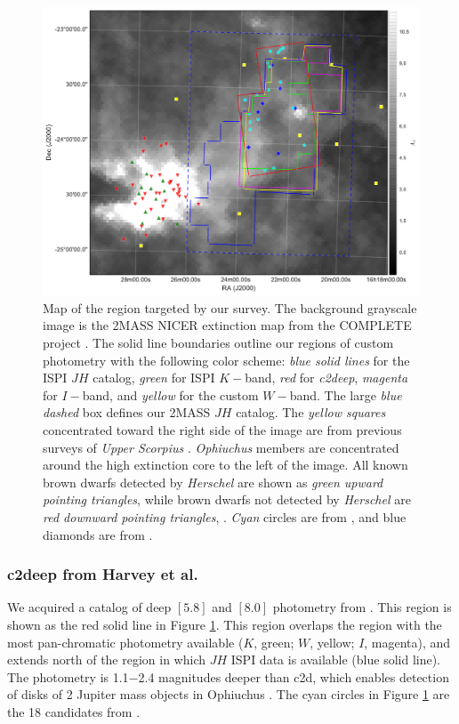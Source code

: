 \begin{figure}[ht!]
\caption[Map of the region of \emph{Ophiuchus} targeted in our survey]{Map of the region targeted by our survey.  The background grayscale image is the 2MASS NICER extinction map \citep{2008A&A...489..143L} from the COMPLETE project \citep{2006AJ....131.2921R}.  The solid line boundaries outline our regions of custom photometry with the following color scheme: \emph{blue solid lines} for the ISPI $JH$ catalog, \emph{green} for ISPI $K-$band, \emph{red} for \emph{c2deep}, \emph{magenta} for $I-$band, and \emph{yellow} for the custom $W-$band.  The large \emph{blue dashed} box defines our 2MASS $JH$ catalog.  The \emph{yellow squares} concentrated toward the right side of the image are from previous surveys of \emph{Upper Scorpius} \cite{2006AJ....131.3016S}.  \emph{Ophiuchus} members are concentrated around the high extinction core to the left of the image.  All known brown dwarfs detected by \emph{Herschel} are shown as \emph{green upward pointing triangles}, while brown dwarfs not detected by \emph{Herschel} are \emph{red downward pointing triangles}, \cite{2013A&A...559A.126A}. \emph{Cyan} circles are from \citet{2010ApJ...720.1374H}, and blue diamonds are from \citet{allers06}.\label{fig_star_chart}}
\centering
\includegraphics[scale=0.5]{chIMACS/figures/Ophiuchus_map}
\end{figure}


\subsubsection{c2deep from Harvey et al.}
We acquired a catalog of deep $[5.8]$ and $[8.0]$ photometry from \citet{2010ApJ...720.1374H}.  This region is shown as the red solid line in Figure \ref{fig_star_chart}.  This region overlaps the region with the most pan-chromatic photometry available ($K$, green; $W$, yellow; $I$, magenta), and extends north of the region in which $JH$ ISPI data is available (blue solid line).  The \citet{2010ApJ...720.1374H} photometry is 1.1$-$2.4 magnitudes deeper than c2d, which enables detection of disks of 2 Jupiter mass objects in Ophiuchus \citep{allers06}.  The cyan circles in Figure \ref{fig_star_chart} are the 18 candidates from \citet{2010ApJ...720.1374H}.  


